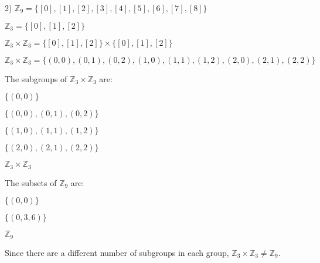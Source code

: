 \documentclass[executivepaper]{article}
\begin{document}
\begin{flushleft}

2) $\mathbb{Z}_{9}=\big\{[0], [1], [2], [3], [4], [5], [6], [7], [8]\big\}$

\vspace{3mm}

$\mathbb{Z}_{3}=\big\{[0], [1], [2]\big\}$

\vspace{3mm}

$\mathbb{Z}_{3} \times \mathbb{Z}_{3}=\big\{[0], [1], [2]\big\} \times \big\{[0], [1], [2]\big\}$

\vspace{3mm}

$\mathbb{Z}_{3} \times \mathbb{Z}_{3}=\big\{(0,0), (0,1), (0,2), (1,0), (1,1), (1,2), (2,0), (2,1), (2,2)\big\}$

\vspace{3mm}

The subgroups of $\mathbb{Z}_{3} \times \mathbb{Z}_{3}$ are: 

\vspace{3mm}

$\big\{(0,0)\big\}$

\vspace{3mm}

$\big\{(0,0), (0,1), (0,2)\big\}$

\vspace{3mm}

$\big\{(1,0), (1,1), (1,2)\big\}$

\vspace{3mm}

$\big\{(2,0), (2,1), (2,2)\big\}$

\vspace{3mm}

$\mathbb{Z}_{3} \times \mathbb{Z}_{3}$

\vspace{3mm}

The subsets of $\mathbb{Z}_{9}$ are:

\vspace{3mm}

$\big\{(0,0)\big\}$

\vspace{3mm}

$\big\{(0, 3, 6)\big\}$

\vspace{3mm}

$\mathbb{Z}_{9}$

\vspace{3mm}

Since there are a different number of subgroups in each group, $\mathbb{Z}_{3} \times \mathbb{Z}_{3} \neq \mathbb{Z}_{9}$.

\end{flushleft}
\end{document}
